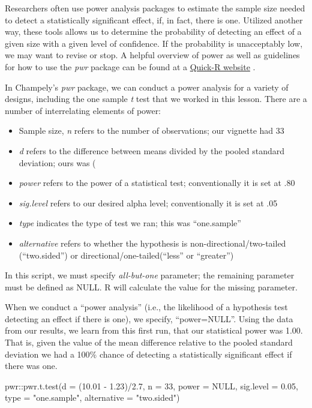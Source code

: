 \documentclass[
  11pt,
]{book}
\newenvironment{Shaded}{\begin{snugshade}}{\end{snugshade}}
\newcommand{\AttributeTok}[1]{\textcolor[rgb]{0.77,0.63,0.00}{#1}}
\newcommand{\ConstantTok}[1]{\textcolor[rgb]{0.00,0.00,0.00}{#1}}
\newcommand{\DecValTok}[1]{\textcolor[rgb]{0.00,0.00,0.81}{#1}}
\newcommand{\FloatTok}[1]{\textcolor[rgb]{0.00,0.00,0.81}{#1}}
\newcommand{\FunctionTok}[1]{\textcolor[rgb]{0.00,0.00,0.00}{#1}}
\newcommand{\NormalTok}[1]{#1}
\newcommand{\SpecialCharTok}[1]{\textcolor[rgb]{0.00,0.00,0.00}{#1}}
\newcommand{\StringTok}[1]{\textcolor[rgb]{0.31,0.60,0.02}{#1}}
\providecommand{\tightlist}{%
  \setlength{\itemsep}{0pt}\setlength{\parskip}{0pt}}
\begin{document}
Researchers often use power analysis packages to estimate the sample size needed to detect a statistically significant effect, if, in fact, there is one. Utilized another way, these tools allows us to determine the probability of detecting an effect of a given size with a given level of confidence. If the probability is unacceptably low, we may want to revise or stop. A helpful overview of power as well as guidelines for how to use the \emph{pwr} package can be found at a \href{https://www.statmethods.net/stats/power.html}{Quick-R website} \citep{kabacoff_power_2017}.

In Champely's \emph{pwr} package, we can conduct a power analysis for a variety of designs, including the one sample \emph{t} test that we worked in this lesson. There are a number of interrelating elements of power:

\begin{itemize}
\tightlist
\item
  Sample size, \emph{n} refers to the number of observations; our vignette had 33
\item
  \emph{d} refers to the difference between means divided by the pooled standard deviation; ours was (
\item
  \emph{power} refers to the power of a statistical test; conventionally it is set at .80
\item
  \emph{sig.level} refers to our desired alpha level; conventionally it is set at .05
\item
  \emph{type} indicates the type of test we ran; this was ``one.sample''
\item
  \emph{alternative} refers to whether the hypothesis is non-directional/two-tailed (``two.sided'') or directional/one-tailed(``less'' or ``greater'')
\end{itemize}

In this script, we must specify \emph{all-but-one} parameter; the remaining parameter must be defined as NULL. R will calculate the value for the missing parameter.

When we conduct a ``power analysis'' (i.e., the likelihood of a hypothesis test detecting an effect if there is one), we specify, ``power=NULL''. Using the data from our results, we learn from this first run, that our statistical power was 1.00. That is, given the value of the mean difference relative to the pooled standard deviation we had a 100\% chance of detecting a statistically significant effect if there was one.

\begin{Shaded}
\begin{Highlighting}[]
\NormalTok{pwr}\SpecialCharTok{::}\FunctionTok{pwr.t.test}\NormalTok{(}\AttributeTok{d =}\NormalTok{ (}\FloatTok{10.01} \SpecialCharTok{{-}} \FloatTok{1.23}\NormalTok{)}\SpecialCharTok{/}\FloatTok{2.7}\NormalTok{, }\AttributeTok{n =} \DecValTok{33}\NormalTok{, }\AttributeTok{power =} \ConstantTok{NULL}\NormalTok{, }\AttributeTok{sig.level =} \FloatTok{0.05}\NormalTok{,}
    \AttributeTok{type =} \StringTok{"one.sample"}\NormalTok{, }\AttributeTok{alternative =} \StringTok{"two.sided"}\NormalTok{)}
\end{Highlighting}
\end{Shaded}
\end{document}
